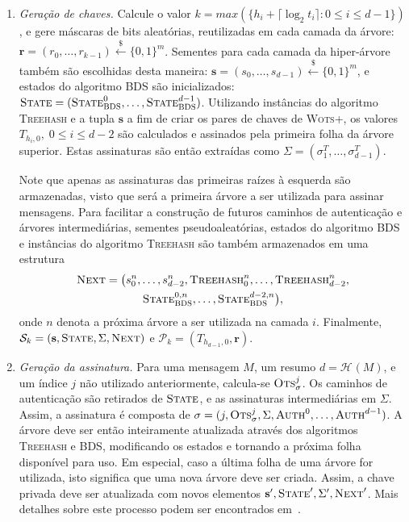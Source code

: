 \documentclass[12pt,notitlepage]{report}
\newcommand{\pk}{\mathcal{P}_k}
\newcommand{\sk}{\mathcal{S}_k}
\newcommand{\hash}[2][]{\mathcal{H}^{#1}(#2)}
\newcommand{\binwds}[1]{\{0, 1\}^{#1}}
\newcommand{\wotsplus}{\textsc{Wots+}}
\begin{document}
\begin{enumerate}

  \item[] \emph{Geração de chaves.} Calcule o valor $k = max(\{h_i + \lceil \log_2 t_i \rceil : 0 \leq i \leq d - 1\})$, e gere máscaras de bits aleatórias, reutilizadas em cada camada da árvore: $\mathbf{r} = (r_0, \dots, r_{k - 1}) \stackrel{\$}{\longleftarrow} \binwds{m}$. Sementes para cada camada da hiper-árvore também são escolhidas desta maneira: $\textbf{s} = (s_0, \dots, s_{d - 1}) \stackrel{\$}{\longleftarrow} \binwds{m}$, e estados do algoritmo BDS são inicializados: $\textsc{State} = (\textsc{State}_{\textsc{BDS}}^{0}, \dots, \textsc{State}_{\textsc{BDS}}^{d - 1})$. Utilizando instâncias do algoritmo \textsc{Treehash} e a tupla $\textbf{s}$ a fim de criar os pares de chaves de \wotsplus{}, os valores $T_{h_{i}, 0}, \; 0 \leq i \leq d - 2$ são calculados e assinados pela primeira folha da árvore superior. Estas assinaturas são então extraídas como $\Sigma = (\sigma_{1}^{T}, \dots, \sigma_{d - 1}^{T})$.

  Note que apenas as assinaturas das primeiras raízes à esquerda são armazenadas, visto que será a primeira árvore a ser utilizada para assinar mensagens. Para facilitar a construção de futuros caminhos de autenticação e árvores intermediárias, sementes pseudoaleatórias, estados do algoritmo BDS e instâncias do algoritmo \textsc{Treehash} são também armazenados em uma estrutura
  \begin{multline}
  \textsc{Next} = \big(s^{n}_{0}, \dots, s^{n}_{d - 2}, \textsc{Treehash}^{n}_{0}, \dots, \textsc{Treehash}^{n}_{d - 2}, \\
  \textsc{State}_{\textsc{BDS}}^{0, n}, \dots, \textsc{State}_{\textsc{BDS}}^{d - 2, n}\big),
  \end{multline}
  onde $n$ denota a próxima árvore a ser utilizada na camada $i$. Finalmente, $\sk{} = (\textbf{s}, \textsc{State}, \Sigma, \textsc{Next})$ e $\pk{} = (T_{h_{d - 1}, 0}, \mathbf{r})$.

  \item[] \emph{Geração da assinatura.} Para uma mensagem $M$, um resumo $d = \hash{M}$, e um índice $j$ não utilizado anteriormente, calcula-se $\textsc{Ots}_\sigma^{j}$. Os caminhos de autenticação são retirados de $\textsc{State}$, e as assinaturas intermediárias em $\Sigma$. Assim, a assinatura é composta de $\sigma = (j, \textsc{Ots}_{\sigma}^{j}, \Sigma, \textsc{Auth}^{0}, \dots, \textsc{Auth}^{d - 1})$. A árvore deve ser então inteiramente atualizada através dos algoritmos \textsc{Treehash} e BDS, modificando os estados e tornando a próxima folha disponível para uso. Em especial, caso a última folha de uma árvore for utilizada, isto significa que uma nova árvore deve ser criada. Assim, a chave privada deve ser atualizada com novos elementos $\textbf{s}', \textsc{State}', \Sigma', \textsc{Next}'$. Mais detalhes sobre este processo podem ser encontrados em~\cite[2]{xmssmt}.


\end{enumerate}
\end{document}
